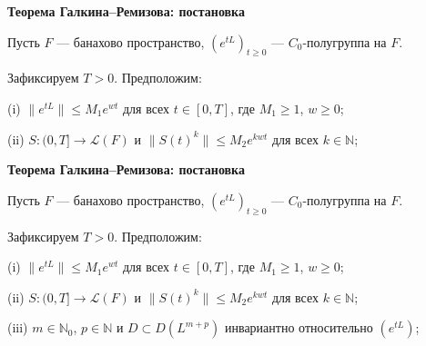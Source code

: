 \documentclass[11pt]{article}
\newcommand{\N}{\mathbb{N}}
\begin{document}
\newpage

\begin{center}
{\color{notaeYELLOW}\bfseries\fontsize{44}{52}\selectfont Теорема Галкина--Ремизова: постановка}
\end{center}
\vspace*{\fill}
\begin{center}
\fontsize{36}{43}\selectfont
\parbox{\linewidth}{\centering\noindent Пусть $F$ --- банахово пространство, $(e^{tL})_{t\ge0}$ --- $C_0$-полугруппа на $F$.
\par}\vspace{0.4in}
\parbox{\linewidth}{\centering\noindent Зафиксируем $T>0$. Предположим:
\par}\vspace{0.4in}
\parbox{\linewidth}{\centering\noindent (i) $\|e^{tL}\|\le M_1e^{wt}$ для всех $t\in[0,T]$, где $M_1\ge1$, $w\ge0$;
\par}\vspace{0.4in}
\parbox{\linewidth}{\centering\noindent (ii) $S:(0,T]\to\mathcal{L}(F)$ и $\|S(t)^k\|\le M_2e^{kwt}$ для всех $k\in\N$;
\par}\vspace{0.4in}
\end{center}
\vspace*{\fill}

\newpage

\begin{center}
{\color{notaeYELLOW}\bfseries\fontsize{44}{52}\selectfont Теорема Галкина--Ремизова: постановка}
\end{center}
\vspace*{\fill}
\begin{center}
\fontsize{36}{43}\selectfont
\parbox{\linewidth}{\centering\noindent Пусть $F$ --- банахово пространство, $(e^{tL})_{t\ge0}$ --- $C_0$-полугруппа на $F$.
\par}\vspace{0.4in}
\parbox{\linewidth}{\centering\noindent Зафиксируем $T>0$. Предположим:
\par}\vspace{0.4in}
\parbox{\linewidth}{\centering\noindent (i) $\|e^{tL}\|\le M_1e^{wt}$ для всех $t\in[0,T]$, где $M_1\ge1$, $w\ge0$;
\par}\vspace{0.4in}
\parbox{\linewidth}{\centering\noindent (ii) $S:(0,T]\to\mathcal{L}(F)$ и $\|S(t)^k\|\le M_2e^{kwt}$ для всех $k\in\N$;
\par}\vspace{0.4in}
\parbox{\linewidth}{\centering\noindent (iii) $m\in\N_0$, $p\in\N$ и $D\subset D(L^{m+p})$ инвариантно относительно $(e^{tL})$;
\par}\vspace{0.4in}
\end{center}
\vspace*{\fill}
\end{document}
